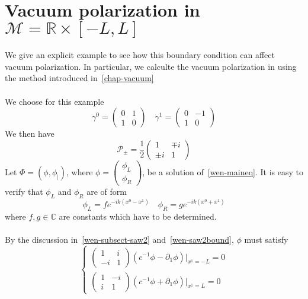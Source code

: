 \section{Vacuum polarization in $\mathcal{M} = \mathbb R \times [-L, L]$ }\label{wen-sect-ex1d}
We give an explicit example to see how this boundary condition can affect vacuum polarization. 
In particular, we calculte the vacuum polarization in using the method introduced in~\cref{chap-vacuum}\\\\
We choose for this example
\begin{equation*}
\gamma^0 = \begin{pmatrix} 0 & 1 \\ 1 & 0 \end{pmatrix} \quad
\gamma^1 = \begin{pmatrix} 0 & -1 \\ 1 & 0 \end{pmatrix}
\end{equation*}
We then have 
\begin{equation*}
 \mathcal{P}_\pm = \frac 1 2  \begin{pmatrix} 1 & \mp i \\ \pm i & 1 \end{pmatrix}
\end{equation*}
Let $\Phi = (\phi, \phi_|)$, where $\phi = \begin{pmatrix} \phi_L \\ \phi_R \end{pmatrix}$, be a solution of~\cref{wen-maineq}. 
It is easy to verify that $\phi_L$ and $\phi_R$ are of form
\begin{equation*}
\phi_L = f e^{-ik(x^0 - x^1)} \quad
\phi_R = g e^{-ik(x^0 + x^1)}
\end{equation*}
where $f, g\in\mathbb C$ are constants which have to be determined. \\\\
By the discussion in~\cref{wen-subsect-saw2} and~\cref{wen-saw2bound}, $\phi$ must satisfy
\begin{equation*}
\begin{cases}
\begin{pmatrix} 1 & i \\ -i & 1 \end{pmatrix}(c^{-1} \phi - \partial_1 \phi)\vert_{x^1 = -L} = 0 \\
%
\begin{pmatrix} 1 & -i \\ i & 1 \end{pmatrix}(c^{-1} \phi + \partial_1 \phi)\vert_{x^1 = L} = 0
\end{cases}
\end{equation*}
